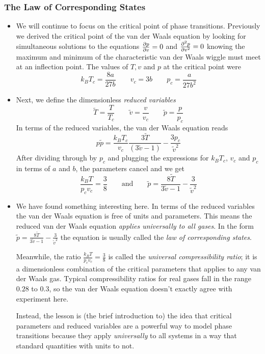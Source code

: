 \documentclass[11pt, a4paper]{article}
\newcommand{\eqtext}[1]{\qquad \text{#1} \qquad}
\begin{document}
\subsubsection{The Law of Corresponding States}
\begin{itemize}
	\item We will continue to focus on the critical point of phase transitions. Previously we derived the critical point of the van der Waals equation by looking for simultaneous solutions to the equations $ \pdv{p}{v} = 0 $ and $ \pdv[2]{p}{v} = 0 $ knowing the maximum and minimum of the characteristic van der Waals wiggle must meet at an inflection point. The values of $ T, v $ and $ p $ at the critical point were
	\begin{equation*}
		k_{B}T_{c} = \frac{8a}{27b} \qquad v_{c} = 3b \qquad p_{c} = \frac{a}{27b^{2}}
	\end{equation*}
	
	\item Next, we define the dimensionless \textit{reduced variables} 
	\begin{equation*}
		\tilde{T} = \frac{T}{T_{c}} \qquad \tilde{v} = \frac{v}{v_{c}} \qquad \tilde{p} = \frac{p}{p_{c}}
	\end{equation*}
	In terms of the reduced variables, the van der Waals equation reads
	\begin{equation*}
		p \tilde{p} = \frac{k_{B}T_{c}}{v_{c}} \frac{3 \tilde{T}}{(3 \tilde{v} -1)} - \frac{3 p_{c}}{\tilde{v}^{2}}
	\end{equation*}
	After dividing through by $ p_{c} $ and plugging the expressions for $ k_{B}T_{c} $, $ v_{c} $ and $ p_{c} $ in terms of $ a $ and $ b $, the parameters cancel and we get
	\begin{equation*}
		\frac{k_{B}T}{p_{c}v_{c}} = \frac{3}{8} \eqtext{and} \tilde{p} = \frac{8 \tilde{T}}{3\tilde{v}-1} - \frac{3}{\tilde{v}^{2}}
	\end{equation*}
	
	\item We have found something interesting here. In terms of the reduced variables the van der Waals equation is free of units and parameters. This means the reduced van der Waals equation \textit{applies universally to all gases}. In the form $ \tilde{p} = \frac{8 \tilde{T}}{3\tilde{v}-1} - \frac{3}{\tilde{v}^{2}} $ the equation is usually called the \textit{law of corresponding states}.
	
	Meanwhile, the ratio $ 	\frac{k_{B}T}{p_{c}v_{c}} = \frac{3}{8}  $ is called the \textit{universal compressibility ratio}; it is a dimensionless combination of the critical parameters that applies to any van der Waals gas. Typical compressibility ratios for real gases fall in the range $ 0.28 $ to $ 0.3 $, so the van der Waals equation doesn't exactly agree with experiment here.
	
	Instead, the lesson is (the brief introduction to) the idea that critical parameters and reduced variables are a powerful way to model phase transitions because they apply \textit{universally} to all systems in a way that standard quantities with units to not.

\end{itemize}
\end{document}
